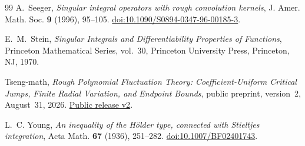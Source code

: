 \documentclass[11pt]{article}
\numberwithin{equation}{section}
\theoremstyle{remark}
\theoremstyle{definition}
\begin{document}
\begin{thebibliography}{99}
A.~Seeger,
\emph{Singular integral operators with rough convolution kernels},
J. Amer. Math. Soc. \textbf{9} (1996), 95--105.
\href{https://doi.org/10.1090/S0894-0347-96-00185-3}
{doi:10.1090/S0894-0347-96-00185-3}.

E.~M.~Stein,
\emph{Singular Integrals and Differentiability Properties of Functions},
Princeton Mathematical Series, vol.~30,
Princeton University Press, Princeton, NJ, 1970.


Tseng-math,
\emph{Rough Polynomial Fluctuation Theory: Coefficient-Uniform Critical
Jumps, Finite Radial Variation, and Endpoint Bounds},
public preprint, version~2, August~31, 2026.
\href{https://github.com/Tseng-math/rough-polynomial-fluctuation-theory/releases/tag/v2}
{Public release v2}.

L.~C. Young,
\emph{An inequality of the H\"older type, connected with Stieltjes
integration},
Acta Math. \textbf{67} (1936), 251--282.
\href{https://doi.org/10.1007/BF02401743}
{doi:10.1007/BF02401743}.


\end{thebibliography}
\end{document}
